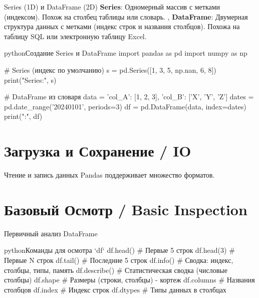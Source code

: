 \begin{textbox}{Series (1D) и DataFrame (2D)}
\textbf{Series}: Одномерный массив с метками (индексом). Похож на столбец таблицы или словарь. \sep %
\textbf{DataFrame}: Двумерная структура данных с метками (индекс строк и названия столбцов). Похожа на таблицу SQL или электронную таблицу Excel.

\begin{codebox}{python}{Создание Series и DataFrame}
import pandas as pd
import numpy as np

# Series (индекс по умолчанию)
s = pd.Series([1, 3, 5, np.nan, 6, 8])
print("Series:\n", s)

# DataFrame из словаря
data = {'col_A': [1, 2, 3], 'col_B': ['X', 'Y', 'Z']}
dates = pd.date_range('20240101', periods=3)
df = pd.DataFrame(data, index=dates)
print("\nDataFrame:\n", df)
\end{codebox}
\end{textbox}

\section{Загрузка и Сохранение / IO}

\begin{myblock}{Чтение и запись данных}
Pandas поддерживает множество форматов.
\end{myblock}

\section{Базовый Осмотр / Basic Inspection}
\begin{textbox}{Первичный анализ DataFrame}
\begin{codebox}{python}{Команды для осмотра `df`}
df.head()       # Первые 5 строк
df.head(3)      # Первые N строк
df.tail()       # Последние 5 строк
df.info()       # Сводка: индекс, столбцы, типы, память
df.describe()   # Статистическая сводка (числовые столбцы)
df.shape        # Размеры (строки, столбцы) - кортеж
df.columns      # Названия столбцов
df.index        # Индекс строк
df.dtypes       # Типы данных в столбцах
\end{codebox}
\end{textbox}

